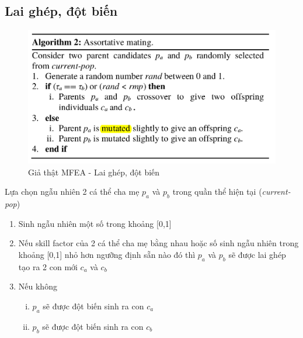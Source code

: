 \documentclass[a4paper,12pt]{report}
\begin{document}
\subsection{Lai ghép, đột biến}
\begin{figure}[H]
\centering 
\includegraphics[scale=0.6]{al2.png}
\caption{Giả thật MFEA - Lai ghép, đột biến}
\end{figure}  
Lựa chọn ngẫu nhiên 2 cá thể cha mẹ $p_a$ và $p_b$ trong quần thể hiện tại (\emph{current-pop})
\begin{enumerate}
\item Sinh ngẫu nhiên một số trong khoảng [0,1] 
\item Nếu skill factor của 2 cá thể cha mẹ bằng nhau hoặc số sinh ngẫu nhiên trong khoảng [0,1] nhỏ hơn ngưỡng định sẵn nào đó thì $p_a$ và $p_b$ sẽ được lai ghép tạo ra 2 con mới $c_a$ và $c_b$
\item Nếu không 
\begin{enumerate}[i.]
\item $p_a$ sẽ được đột biến sinh ra con $c_a$
\item $p_b$ sẽ được đột biến sinh ra con $c_b$
\end{enumerate}
\end{enumerate}
\end{document}
